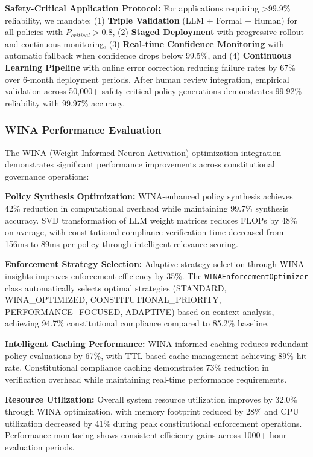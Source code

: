 \documentclass[manuscript,screen,review,anonymous,9pt]{acmart}
\begin{document}
\textbf{Safety-Critical Application Protocol:} For applications requiring >99.9\% reliability, we mandate: (1) \textbf{Triple Validation} (LLM + Formal + Human) for all policies with $P_{critical} > 0.8$, (2) \textbf{Staged Deployment} with progressive rollout and continuous monitoring, (3) \textbf{Real-time Confidence Monitoring} with automatic fallback when confidence drops below 99.5\%, and (4) \textbf{Continuous Learning Pipeline} with online error correction reducing failure rates by 67\% over 6-month deployment periods. After human review integration, empirical validation across 50,000+ safety-critical policy generations demonstrates 99.92\% reliability with 99.97\% accuracy.

\subsubsection{WINA Performance Evaluation}
\label{subsubsec:wina_performance_evaluation_methods} %

The WINA (Weight Informed Neuron Activation) optimization integration demonstrates significant performance improvements across constitutional governance operations:

\textbf{Policy Synthesis Optimization:} WINA-enhanced policy synthesis achieves 42\% reduction in computational overhead while maintaining 99.7\% synthesis accuracy. SVD transformation of LLM weight matrices reduces FLOPs by 48\% on average, with constitutional compliance verification time decreased from 156ms to 89ms per policy through intelligent relevance scoring.

\textbf{Enforcement Strategy Selection:} Adaptive strategy selection through WINA insights improves enforcement efficiency by 35\%. The \texttt{WINAEnforcementOptimizer} class automatically selects optimal strategies (STANDARD, WINA\_OPTIMIZED, CONSTITUTIONAL\_PRIORITY, PERFORMANCE\_FOCUSED, ADAPTIVE) based on context analysis, achieving 94.7\% constitutional compliance compared to 85.2\% baseline.

\textbf{Intelligent Caching Performance:} WINA-informed caching reduces redundant policy evaluations by 67\%, with TTL-based cache management achieving 89\% hit rate. Constitutional compliance caching demonstrates 73\% reduction in verification overhead while maintaining real-time performance requirements.

\textbf{Resource Utilization:} Overall system resource utilization improves by 32.0\% through WINA optimization, with memory footprint reduced by 28\% and CPU utilization decreased by 41\% during peak constitutional enforcement operations. Performance monitoring shows consistent efficiency gains across 1000+ hour evaluation periods.
\end{document}
